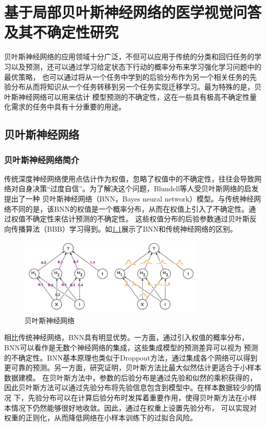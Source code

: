 \chapter{基于局部贝叶斯神经网络的医学视觉问答及其不确定性研究}
贝叶斯神经网络的应用领域十分广泛，不但可以应用于传统的分类和回归任务的学习以及预测，还可以通过学习给定状态下行动的概率分布来学习强化学习问题中的最优策略，
也可以通过将从一个任务中学到的后验分布作为另一个相关任务的先验分布从而将知识从一个任务转移到另一个任务实现迁移学习。最为特殊的是，贝叶斯神经网络可以用来估计
模型预测的不确定性，这在一些具有极高不确定性量化需求的任务中具有十分重要的用途。
%
\section{贝叶斯神经网络}
\subsection{贝叶斯神经网络简介}
传统深度神经网络使用点估计作为权值，忽略了权值中的不确定性，往往会导致网络对自身决策“过度自信”\cite{shridhar2019comprehensive}。为了解决这个问题，Blundell等人\cite{blundell2015weight}受贝叶斯网络的启发提出了一种
贝叶斯神经网络（BNN，Bayes neural network）模型。与传统神经网络不同的是，该BNN的权值是一个概率分布，从而在权值上引入了不确定性。通过权值不确定性来估计预测的不确定性。
这些权值分布的后验参数通过贝叶斯反向传播算法（BBB）学习得到。如\ref{BNN}展示了BNN和传统神经网络的区别。
\begin{figure}[htbp]
	\centering	
	\includegraphics[width=0.8\textwidth]{Fig/myfig/chapter4/BNN.png}  %
	\caption{\label{BNN}贝叶斯神经网络} 
\end{figure}

相比传统神经网络，BNN具有明显优势。一方面，通过引入权值的概率分布，BNN可以看作是无数个神经网络的集成，这些集成模型的预测差异可以视为
预测的不确定性。BNN基本原理也类似于Droppout方法\cite{gal2016dropout}，通过集成各个网络可以得到更可靠的预测。另一方面，研究证明，贝叶斯方法比最大似然估计更适合于小样本数据建模。
在贝叶斯方法中，参数的后验分布是通过先验和似然的乘积获得的，因此贝叶斯方法可以通过先验分布将先验信息包含到模型中。在样本数据较少的情况
下，先验分布可以在计算后验分布时发挥着重要作用，使得贝叶斯方法在小样本情况下仍然能够很好地收敛\cite{mcneish2016using}。因此，通过在权重上设置先验分布，
可以实现对权重的正则化，从而降低网络在小样本训练下的过拟合风险\cite{welling2011bayesian}。

